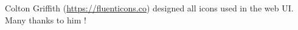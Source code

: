 Colton Griffith (\url{https://fluenticons.co}) designed all icons used
in the web UI. Many thanks to him !
